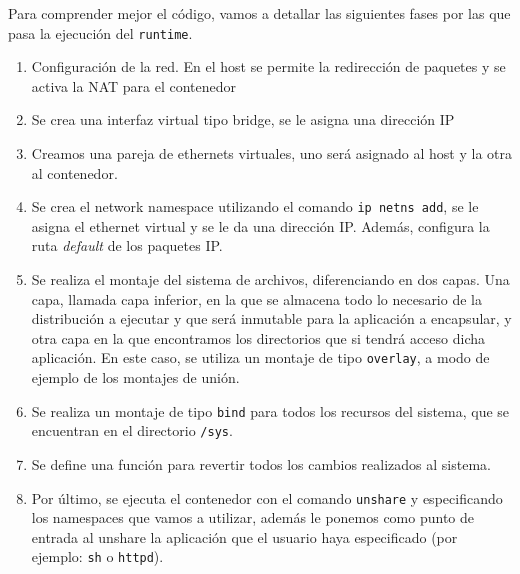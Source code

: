 \documentclass[12pt]{article}
\begin{document}
	\vspace{10px}

	\noindent Para comprender mejor el código, vamos a detallar las siguientes fases por las que pasa la ejecución del \texttt{runtime}.
	\begin{enumerate}
		\item Configuración de la red. En el host se permite la redirección de paquetes y se activa la NAT para el contenedor
		\item Se crea una interfaz virtual tipo bridge, se le asigna una dirección IP
		\item Creamos una pareja de ethernets virtuales, uno será asignado al host y la otra al contenedor.
		\item Se crea el network namespace utilizando el comando \texttt{ip netns add}, se le asigna el ethernet virtual y se le da una dirección IP. Además, configura la ruta \textit{default} de los paquetes IP.
		\item Se realiza el montaje del sistema de archivos, diferenciando en dos capas. Una capa, llamada capa inferior, en la que se almacena todo lo necesario de la distribución a ejecutar y que será inmutable para la aplicación a encapsular, y otra capa en la que encontramos los directorios que si tendrá acceso dicha aplicación. En este caso, se utiliza un montaje de tipo \texttt{overlay}, a modo de ejemplo de los montajes de unión.
		\item Se realiza un montaje de tipo \texttt{bind} para todos los recursos del sistema, que se encuentran en el directorio \texttt{/sys}.
		\item Se define una función para revertir todos los cambios realizados al sistema.
		\item Por último, se ejecuta el contenedor con el comando \texttt{unshare} y especificando los namespaces que vamos a utilizar, además le ponemos como punto de entrada al unshare la aplicación que el usuario haya especificado (por ejemplo: \texttt{sh} o \texttt{httpd}).
	\end{enumerate}

	\pagebreak
	
\end{document}
